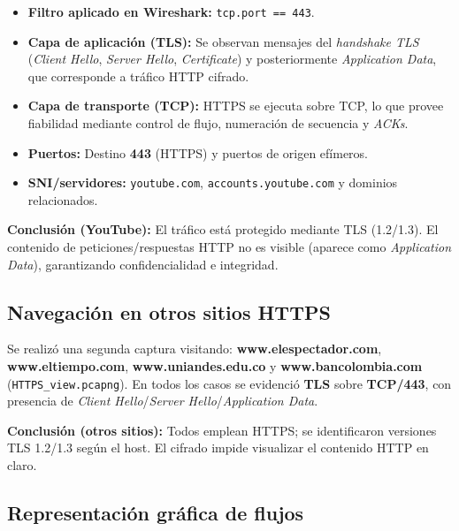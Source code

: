 \documentclass[10pt]{article}
\begin{document}
\begin{itemize}
    \item \textbf{Filtro aplicado en Wireshark:} \texttt{tcp.port == 443}.
    \item \textbf{Capa de aplicación (TLS):} Se observan mensajes del \textit{handshake TLS} (\textit{Client Hello}, \textit{Server Hello}, \textit{Certificate}) y posteriormente \textit{Application Data}, que corresponde a tráfico HTTP cifrado.
    \item \textbf{Capa de transporte (TCP):} HTTPS se ejecuta sobre TCP, lo que provee fiabilidad mediante control de flujo, numeración de secuencia y \textit{ACKs}.
    \item \textbf{Puertos:} Destino \textbf{443} (HTTPS) y puertos de origen efímeros.
    \item \textbf{SNI/servidores:} \texttt{youtube.com}, \texttt{accounts.youtube.com} y dominios relacionados.
\end{itemize}

\noindent\textbf{Conclusión (YouTube):} 
El tráfico está protegido mediante TLS (1.2/1.3). 
El contenido de peticiones/respuestas HTTP no es visible (aparece como \textit{Application Data}), garantizando confidencialidad e integridad.

\subsection{Navegación en otros sitios HTTPS}
Se realizó una segunda captura visitando: \textbf{www.elespectador.com}, \textbf{www.eltiempo.com}, \textbf{www.uniandes.edu.co} y \textbf{www.bancolombia.com} (\texttt{HTTPS\_view.pcapng}). 
En todos los casos se evidenció \textbf{TLS} sobre \textbf{TCP/443}, con presencia de \textit{Client Hello}/\textit{Server Hello}/\textit{Application Data}.

\noindent\textbf{Conclusión (otros sitios):}
Todos emplean HTTPS; se identificaron versiones TLS 1.2/1.3 según el host. 
El cifrado impide visualizar el contenido HTTP en claro.

\subsection*{Representación gráfica de flujos}
\end{document}

